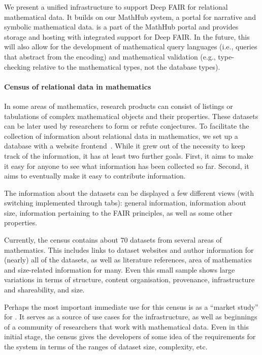 We present a unified infrastructure to support Deep FAIR for relational mathematical data.
It builds on our MathHub system, a portal for narrative and symbolic mathematical data.
\dmh is a part of the MathHub portal and provides storage and hosting with integrated support for Deep FAIR.
In the future, this will also allow for the development of mathematical query languages (i.e., queries that abstract from the encoding) and mathematical validation (e.g., type-checking relative to the mathematical types, not the database types).

\paragraph{Census of relational data in mathematics}
In some areas of mathematics, research products can consist of
listings or tabulations of complex mathematical objects and their properties.
These datasets can be later used by researchers to form or refute conjectures.
To facilitate the collection of information about relational data in mathematics,
we set up a database with a website frontend~\cite{bercic:cmo:table}.
While it grew out of the necessity to keep track of the information, 
it has at least two further goals.
First, it aims to make it easy for anyone to see what information has been collected so far.
Second, it aims to eventually make it easy to contribute information.

The information about the datasets can be displayed a few different views
(with switching implemented through tabs): 
general information, information about size, 
information pertaining to the FAIR principles,
as well as some other properties.

Currently, the census contains about $70$ datasets from several areas of mathematics.
This includes links to dataset websites and author information for (nearly) all of the datasets,
as well as literature references, area of mathematics and size-related information for many.
Even this small sample shows large variations in terms of
structure, content organisation, provenance, infrastructure and shareability, and size.

Perhaps the most important immediate use for this census is as a 
``market study'' for \dmh.
It serves as a source of use cases for the infrastructure,
as well as beginnings of a community of researchers that work with mathematical data.
Even in this initial stage, the census gives the developers of \dmh
some idea of the requirements for the system in terms of the ranges of
dataset size, complexity, etc.

